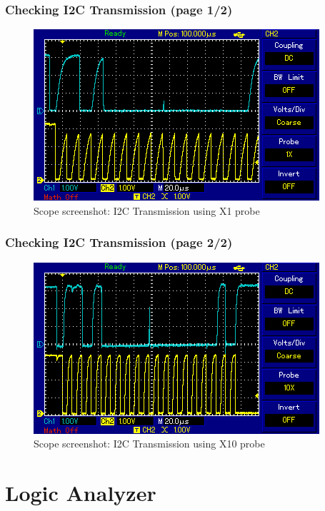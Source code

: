 \begin{frame}
  \frametitle{Checking I2C Transmission (page 1/2)}
  \begin{figure}
    \centering
    \includegraphics[scale=0.75]{images/scope-trace-i2c-x1.png}
    \caption{Scope screenshot: I2C Transmission using X1 probe}
  \end{figure}
\end{frame}

\begin{frame}
  \frametitle{Checking I2C Transmission (page 2/2)}
  \begin{figure}
    \centering
    \includegraphics[scale=0.75]{images/scope-trace-i2c-x10.png}
    \caption{Scope screenshot: I2C Transmission using X10 probe}
  \end{figure}
\end{frame}

\section{Logic Analyzer}

